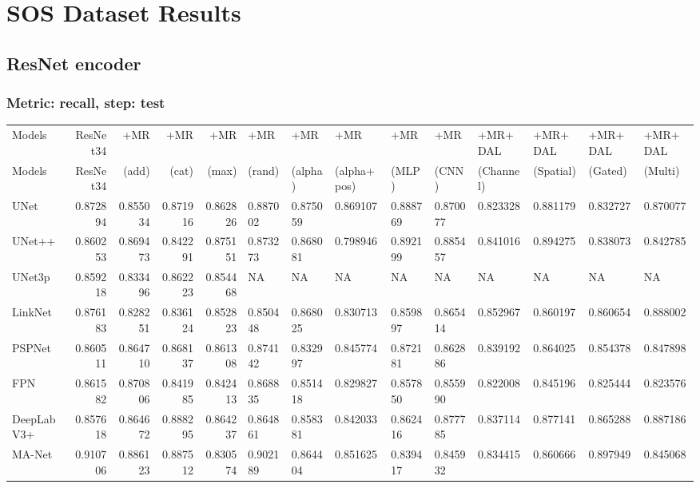 \documentclass{article}
\begin{document}
\section{SOS Dataset Results}

\subsection{ResNet encoder}
\subsubsection{Metric: recall, step: test}
\begin{tabular}{lrrrrlllllllll}
\toprule
Models & ResNet34 & +MR  & +MR  & +MR  & +MR  & +MR  & +MR  & +MR  & +MR  & +MR+DAL & +MR+DAL & +MR+DAL & +MR+DAL \\
Models & ResNet34 &  (add) &  (cat) &  (max) &  (rand) &  (alpha) &  (alpha+pos) &  (MLP) &  (CNN) & (Channel) & (Spatial) & (Gated) & (Multi) \\
\midrule
UNet & 0.872894 & 0.855034 & 0.871916 & 0.862826 & 0.887002 & 0.875059 & 0.869107 & 0.888769 & 0.870077 & 0.823328 & 0.881179 & 0.832727 & 0.870077 \\
UNet++ & 0.860253 & 0.869473 & 0.842291 & 0.875151 & 0.873273 & 0.868081 & 0.798946 & 0.892199 & 0.885457 & 0.841016 & 0.894275 & 0.838073 & 0.842785 \\
UNet3p & 0.859218 & 0.833496 & 0.862223 & 0.854468 & NA & NA & NA & NA & NA & NA & NA & NA & NA \\
LinkNet & 0.876183 & 0.828251 & 0.836124 & 0.852823 & 0.850448 & 0.868025 & 0.830713 & 0.859897 & 0.865414 & 0.852967 & 0.860197 & 0.860654 & 0.888002 \\
PSPNet & 0.860511 & 0.864710 & 0.868137 & 0.861308 & 0.874142 & 0.832997 & 0.845774 & 0.872181 & 0.862886 & 0.839192 & 0.864025 & 0.854378 & 0.847898 \\
FPN & 0.861582 & 0.870806 & 0.841985 & 0.842413 & 0.868835 & 0.851418 & 0.829827 & 0.857850 & 0.855990 & 0.822008 & 0.845196 & 0.825444 & 0.823576 \\
DeepLabV3+ & 0.857618 & 0.864672 & 0.888295 & 0.864237 & 0.864861 & 0.858381 & 0.842033 & 0.862416 & 0.877785 & 0.837114 & 0.877141 & 0.865288 & 0.887186 \\
MA-Net & 0.910706 & 0.886123 & 0.887512 & 0.830574 & 0.902189 & 0.864404 & 0.851625 & 0.839417 & 0.845932 & 0.834415 & 0.860666 & 0.897949 & 0.845068 \\
\bottomrule
\end{tabular}
\end{document}
